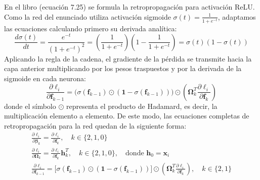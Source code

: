 \documentclass[10pt,a4paper]{article}
\begin{document}
En el libro (ecuación 7.25) se formula la retropropagación para activación ReLU. Como la red del enunciado utiliza activación sigmoide $\sigma(t) = \frac{1}{1 + e^{-t}}$, adaptamos las ecuaciones calculando primero su derivada analítica:
\[
\frac{d\sigma(t)}{dt} = \frac{e^{-t}}{(1 + e^{-t})^2} = \left(\frac{1}{1 + e^{-t}}\right)\left(1 - \frac{1}{1 + e^{-t}}\right) = \sigma(t)(1 - \sigma(t))
\]
Aplicando la regla de la cadena, el gradiente de la pérdida se transmite hacia la capa anterior multiplicando por los pesos traspuestos y por la derivada de la sigmoide en cada neurona:
\[
\frac{\partial \ell_i}{\partial \mathbf{f}_{k-1}} = \Big( \sigma(\mathbf{f}_{k-1}) \odot (\mathbf{1} - \sigma(\mathbf{f}_{k-1})) \Big) \odot \left( \boldsymbol{\Omega}_k^T \frac{\partial \ell_i}{\partial \mathbf{f}_k} \right)
\]
donde el símbolo $\odot$ representa el producto de Hadamard, es decir, la multiplicación elemento a elemento. De este modo, las ecuaciones completas de retropropagación para la red quedan de la siguiente forma:
\begin{gather}
    \frac{\partial \ell_i}{\partial \boldsymbol{\beta}_k} = \frac{\partial \ell_i}{\partial \mathbf{f}_k}, \quad k \in \{2, 1, 0\} \\
    \frac{\partial \ell_i}{\partial \boldsymbol{\Omega}_k} = \frac{\partial \ell_i}{\partial \mathbf{f}_k} \mathbf{h}_k^T, \quad k \in \{2, 1, 0\}, \quad \text{donde } \mathbf{h}_0 = \mathbf{x}_i \\
    \frac{\partial \ell_i}{\partial \mathbf{f}_{k-1}} = \Big[ \sigma(\mathbf{f}_{k-1}) \odot (\mathbf{1} - \sigma(\mathbf{f}_{k-1})) \Big] \odot \left( \boldsymbol{\Omega}_k^T \frac{\partial \ell_i}{\partial \mathbf{f}_k} \right), \quad k \in \{2, 1\}
\end{gather}
\end{document}
